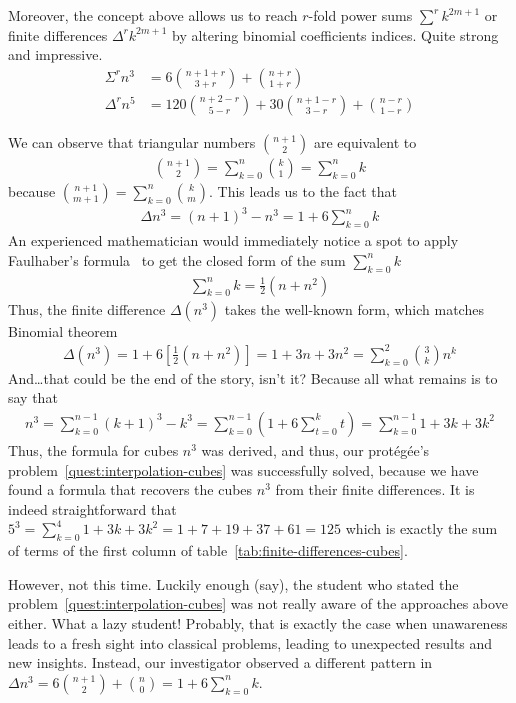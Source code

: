 Moreover, the concept above allows us to reach $r$-fold power sums $\sum^r k^{2m+1}$
or finite differences $\Delta^r k^{2m+1}$ by altering binomial coefficients indices.
Quite strong and impressive.
\begin{align*}
    \Sigma^{r} n^3 &=  6 \binom{n+1+r}{3+r} + \binom{n+r}{1+r} \\
    \Delta^{r} n^5 &= 120 \binom{n+2-r}{5-r} + 30 \binom{n+1-r}{3-r} + \binom{n-r}{1-r}
\end{align*}

We can observe that triangular numbers $\binom{n+1}{2}$ are equivalent to
\begin{align*}
    \binom{n+1}{2} = \sum_{k=0}^{n} \binom{k}{1} = \sum_{k=0}^{n} k
\end{align*}
because $\binom{n+1}{m+1} = \sum_{k=0}^{n} \binom{k}{m}$.
This leads us to the fact that
\begin{align*}
    \Delta n^3 = (n+1)^3 - n^3 = 1 + 6 \sum_{k=0}^{n} k
\end{align*}
An experienced mathematician would immediately notice a spot to apply Faulhaber's formula~\cite{beardon1996sums}
to get the closed form of the sum $\sum_{k=0}^{n} k$
\begin{align*}
    \sum_{k=0}^{n} k = \frac{1}{2}(n+n^2)
\end{align*}
Thus, the finite difference $\Delta(n^3)$ takes the well-known form,
which matches Binomial theorem~\cite{abramowitz1988handbook}
\begin{align*}
    \Delta(n^3)
    = 1 + 6 \left[ \frac{1}{2}(n+n^2) \right]
    = 1 + 3 n + 3 n^2
    = \sum_{k=0}^{2} \binom{3}{k} n^k
\end{align*}
And\ldots that could be the end of the story, isn't it?
Because all what remains is to say that
\begin{align*}
    n^3
    = \sum_{k=0}^{n-1} (k+1)^3 - k^3
    = \sum_{k=0}^{n-1} \left( 1 + 6 \sum_{t=0}^{k} t \right)
    = \sum_{k=0}^{n-1} 1 + 3 k + 3 k^2
\end{align*}
Thus, the formula for cubes $n^3$ was derived, and thus,
our protégée's problem~\eqref{quest:interpolation-cubes} was successfully solved,
because we have found a formula that recovers the cubes $n^3$ from their finite differences.
It is indeed straightforward that $5^3 = \sum_{k=0}^{4} 1 + 3 k + 3 k^2 = 1 + 7 + 19 + 37 + 61 = 125$ which is exactly
the sum of terms of the first column of table~\eqref{tab:finite-differences-cubes}.

However, not this time.
Luckily enough (say), the student who stated the problem~\eqref{quest:interpolation-cubes}
was not really aware of the approaches above either.
What a lazy student!
Probably, that is exactly the case when unawareness leads to a fresh sight into classical problems,
leading to unexpected results and new insights.
Instead, our investigator observed a different pattern in
$\Delta n^3= 6 \binom{n+1}{2} + \binom{n}{0} = 1 +  6 \sum_{k=0}^{n} k$.

